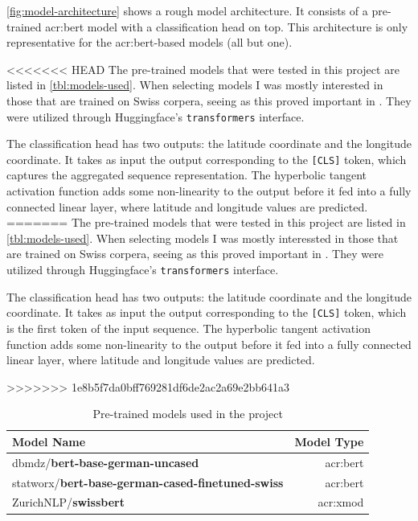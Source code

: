 \autoref{fig:model-architecture} shows a rough model architecture. It consists of a pre-trained \acrshort{acr:bert} model with a classification head on top. This architecture is only representative for the \acrshort{acr:bert}-based models (all but one).

<<<<<<< HEAD
The pre-trained models that were tested in this project are listed in \autoref{tbl:models-used}. When selecting models I was mostly interested in those that are trained on Swiss corpera, seeing as this proved important in \cite{scherrerHeLjuVarDial20202020}. They were utilized through Huggingface's \texttt{transformers} interface.

The classification head has two outputs: the latitude coordinate and the longitude coordinate. It takes as input the output corresponding to the \texttt{[CLS]} token, which captures the aggregated sequence representation. The hyperbolic tangent activation function adds some non-linearity to the output before it fed into a fully connected linear layer, where latitude and longitude values are predicted.
=======
The pre-trained models that were tested in this project are listed in \autoref{tbl:models-used}. When selecting models I was mostly interessted in those that are trained on Swiss corpera, seeing as this proved important in \cite{scherrerHeLjuVarDial20202020}. They were utilized through Huggingface's \texttt{transformers} interface.

The classification head has two outputs: the latitude coordinate and the longitude coordinate. It takes as input the output corresponding to the \texttt{[CLS]} token, which is the first token of the input sequence. The hyperbolic tangent activation function adds some non-linearity to the output before it fed into a fully connected linear layer, where latitude and longitude values are predicted.


>>>>>>> 1e8b5f7da0bff769281df6de2ac2a69e2bb641a3

\begin{table}
    \centering
    \begin{tabular}{l|r}
        \toprule
        Model Name                                               & Model Type          \\
        \midrule
        dbmdz/\textbf{bert-base-german-uncased}                  & \acrshort{acr:bert} \\
        statworx/\textbf{bert-base-german-cased-finetuned-swiss} & \acrshort{acr:bert} \\
        ZurichNLP/\textbf{swissbert}                             & \acrshort{acr:xmod} \\
        \bottomrule
    \end{tabular}
    \caption{Pre-trained models used in the project}
    \label{tbl:models-used}
\end{table}


